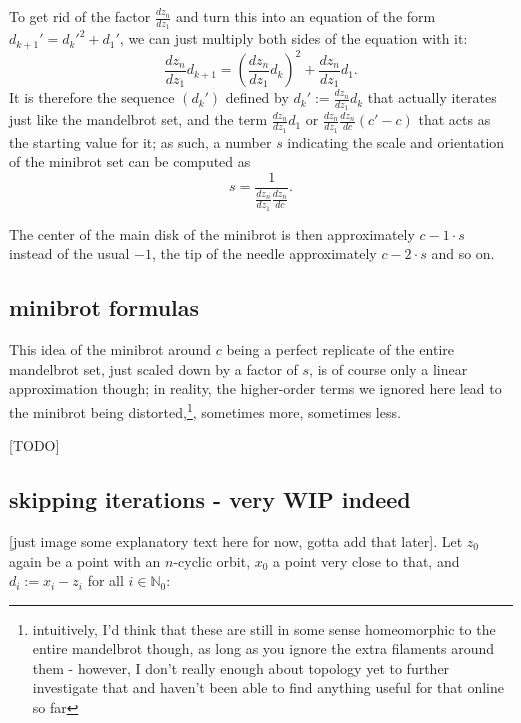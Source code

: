 \documentclass[12pt,a4paper]{article}
\begin{document}
To get rid of the factor $\frac{dz_n}{dz_1}$ and turn this into an equation of the form $d_{k+1}'=d_k'^2+d_1'$, we can just multiply both sides of the equation with it:
$$\frac{dz_n}{dz_1}d_{k+1}=\left(\frac{dz_n}{dz_1}d_k\right)^2+\frac{dz_n}{dz_1}d_1.$$
It is therefore the sequence $(d_k')$ defined by $d_k':=\frac{dz_n}{dz_1}d_k$ that actually iterates just like the mandelbrot set, and the term $\frac{dz_n}{dz_1}d_1$ or $\frac{dz_n}{dz_1}\frac{dz_n}{dc}(c'-c)$ that acts as the starting value for it; as such, a number $s$ indicating the scale and orientation of the minibrot set can be computed as $$s=\frac{1}{\frac{dz_n}{dz_1}\frac{dz_n}{dc}}.$$

The center of the main disk of the minibrot is then approximately $c-1\cdot s$ instead of the usual $-1$, the tip of the needle approximately $c-2\cdot s$ and so on.

\subsection{minibrot formulas}

This idea of the minibrot around $c$ being a perfect replicate of the entire mandelbrot set, just scaled down by a factor of $s$, is of course only a linear approximation though; in reality, the higher-order terms we ignored here lead to the minibrot being distorted,\footnote{intuitively, I'd think that these are still in some sense homeomorphic to the entire mandelbrot though, as long as you ignore the extra filaments around them - however, I don't really enough about topology yet to further investigate that and haven't been able to find anything useful for that online so far}, sometimes more, sometimes less.

[TODO]

\subsection{skipping iterations - very WIP indeed}


[just image some explanatory text here for now, gotta add that later]. Let $z_0$ again be a point with an $n$-cyclic orbit, $x_0$ a point very close to that, and $d_i:=x_i-z_i$ for all $i\in\mathbb{N}_0$:
\end{document}
